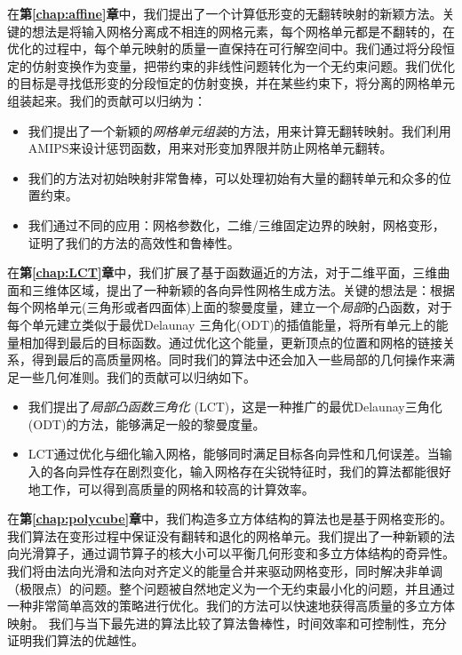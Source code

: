 在\textbf{第\ref{chap:affine}章}中，我们提出了一个计算低形变的无翻转映射的新颖方法。关键的想法是将输入网格分离成不相连的网格元素，每个网格单元都是不翻转的，在优化的过程中，每个单元映射的质量一直保持在可行解空间中。我们通过将分段恒定的仿射变换作为变量，把带约束的非线性问题转化为一个无约束问题。我们优化的目标是寻找低形变的分段恒定的仿射变换，并在某些约束下，将分离的网格单元组装起来。我们的贡献可以归纳为：
\begin{itemize}
  \item 我们提出了一个新颖的\emph{网格单元组装}的方法，用来计算无翻转映射。我们利用AMIPS来设计惩罚函数，用来对形变加界限并防止网格单元翻转。
  \item 我们的方法对初始映射非常鲁棒，可以处理初始有大量的翻转单元和众多的位置约束。
  \item 我们通过不同的应用：网格参数化，二维/三维固定边界的映射，网格变形，证明了我们的方法的高效性和鲁棒性。
\end{itemize}

在\textbf{第\ref{chap:LCT}章}中，我们扩展了基于函数逼近的方法，对于二维平面，三维曲面和三维体区域，提出了一种新颖的各向异性网格生成方法。关键的想法是：根据每个网格单元(三角形或者四面体)上面的黎曼度量，建立一个\emph{局部}的凸函数，对于每个单元建立类似于最优Delaunay 三角化(ODT)的插值能量，将所有单元上的能量相加得到最后的目标函数。通过优化这个能量，更新顶点的位置和网格的链接关系，得到最后的高质量网格。同时我们的算法中还会加入一些局部的几何操作来满足一些几何准则。我们的贡献可以归纳如下。
\begin{itemize}
	\item 我们提出了\emph{局部凸函数三角化} (LCT)，这是一种推广的最优Delaunay三角化(ODT)的方法，能够满足一般的黎曼度量。
	\item LCT通过优化与细化输入网格，能够同时满足目标各向异性和几何误差。当输入的各向异性存在剧烈变化，输入网格存在尖锐特征时，我们的算法都能很好地工作，可以得到高质量的网格和较高的计算效率。
\end{itemize}

在\textbf{第\ref{chap:polycube}章}中，我们构造多立方体结构的算法也是基于网格变形的。我们算法在变形过程中保证没有翻转和退化的网格单元。我们提出了一种新颖的法向光滑算子，通过调节算子的核大小可以平衡几何形变和多立方体结构的奇异性。我们将由法向光滑和法向对齐定义的能量合并来驱动网格变形，同时解决非单调（极限点）的问题。整个问题被自然地定义为一个无约束最小化的问题，并且通过一种非常简单高效的策略进行优化。我们的方法可以快速地获得高质量的多立方体映射。%
我们与当下最先进的算法比较了算法鲁棒性，时间效率和可控制性，充分证明我们算法的优越性。
